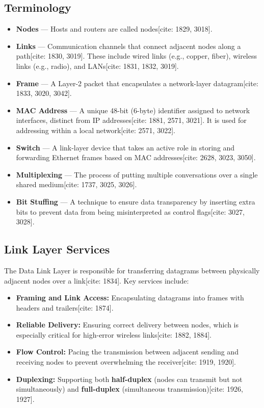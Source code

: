 \documentclass[12pt,a4paper]{article}
\begin{document}
\subsection*{Terminology}
\begin{itemize}
    \item \textbf{Nodes} --- Hosts and routers are called nodes[cite: 1829, 3018].
    \item \textbf{Links} --- Communication channels that connect adjacent nodes along a path[cite: 1830, 3019]. These include wired links (e.g., copper, fiber), wireless links (e.g., radio), and LANs[cite: 1831, 1832, 3019].
    \item \textbf{Frame} --- A Layer-2 packet that encapsulates a network-layer datagram[cite: 1833, 3020, 3042].
    \item \textbf{MAC Address} --- A unique 48-bit (6-byte) identifier assigned to network interfaces, distinct from IP addresses[cite: 1881, 2571, 3021]. It is used for addressing within a local network[cite: 2571, 3022].
    \item \textbf{Switch} --- A link-layer device that takes an active role in storing and forwarding Ethernet frames based on MAC addresses[cite: 2628, 3023, 3050].
    \item \textbf{Multiplexing} --- The process of putting multiple conversations over a single shared medium[cite: 1737, 3025, 3026].
    \item \textbf{Bit Stuffing} --- A technique to ensure data transparency by inserting extra bits to prevent data from being misinterpreted as control flags[cite: 3027, 3028].
\end{itemize}

\subsection*{Link Layer Services}
The Data Link Layer is responsible for transferring datagrams between physically adjacent nodes over a link[cite: 1834]. Key services include:
\begin{itemize}
    \item \textbf{Framing and Link Access:} Encapsulating datagrams into frames with headers and trailers[cite: 1874].
    \item \textbf{Reliable Delivery:} Ensuring correct delivery between nodes, which is especially critical for high-error wireless links[cite: 1882, 1884].
    \item \textbf{Flow Control:} Pacing the transmission between adjacent sending and receiving nodes to prevent overwhelming the receiver[cite: 1919, 1920].
    \item \textbf{Duplexing:} Supporting both \textbf{half-duplex} (nodes can transmit but not simultaneously) and \textbf{full-duplex} (simultaneous transmission)[cite: 1926, 1927].
\end{itemize}
\end{document}
